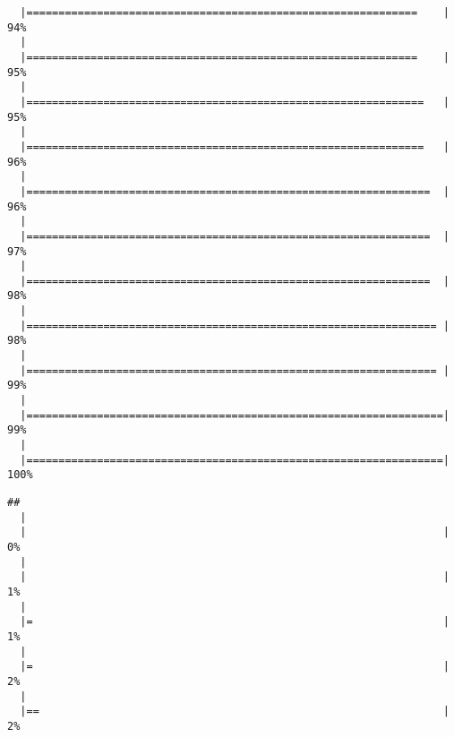 \begin{knitrout}
\begin{kframe}
\begin{verbatim}
  |=============================================================    |  94%
  |                                                                       
  |=============================================================    |  95%
  |                                                                       
  |==============================================================   |  95%
  |                                                                       
  |==============================================================   |  96%
  |                                                                       
  |===============================================================  |  96%
  |                                                                       
  |===============================================================  |  97%
  |                                                                       
  |===============================================================  |  98%
  |                                                                       
  |================================================================ |  98%
  |                                                                       
  |================================================================ |  99%
  |                                                                       
  |=================================================================|  99%
  |                                                                       
  |=================================================================| 100%
\end{verbatim}
\begin{alltt}
 \hlkwb{<-} 
\end{alltt}
\begin{verbatim}
## 
  |                                                                       
  |                                                                 |   0%
  |                                                                       
  |                                                                 |   1%
  |                                                                       
  |=                                                                |   1%
  |                                                                       
  |=                                                                |   2%
  |                                                                       
  |==                                                               |   2%

\end{verbatim}
\end{kframe}
\end{knitrout}
